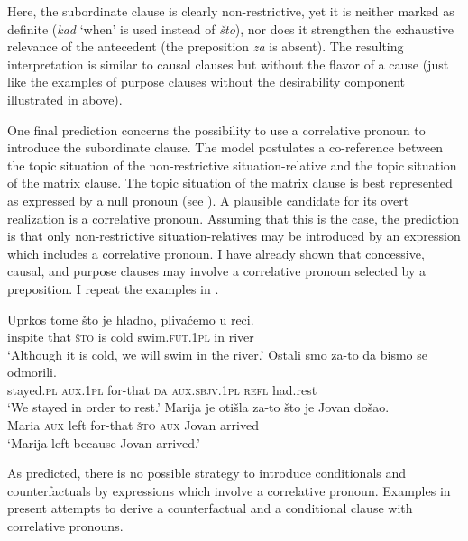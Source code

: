 \documentclass[output=paper]{langscibook}
\begin{document}
\noindent Here, the subordinate clause is clearly non-restrictive, yet it is neither marked as definite (\textit{kad} `when' is used instead of \textit{što}), nor does it strengthen the exhaustive relevance of the antecedent (the preposition \textit{za} is absent). The resulting interpretation is similar to causal clauses but without the flavor of a cause (just like the examples of purpose clauses without the desirability component illustrated in  above).

One final prediction concerns the possibility to use a correlative pronoun to introduce the subordinate clause. The model postulates a co-reference between the topic situation of the non-restrictive situation-relative and the topic situation of the matrix clause. The topic situation of the matrix clause is best represented as expressed by a null pronoun (see \citealt{Vries2002}). A plausible candidate for its overt realization is a correlative pronoun. Assuming that this is the case, the prediction is that only non-restrictive situation-relatives may be introduced by an expression which includes a correlative pronoun. I have already shown that concessive, causal, and purpose clauses may involve a correlative pronoun selected by a preposition. I repeat the examples in .

\ea\label{ex:Correl1}
	\ea \gll Uprkos tome što je hladno, plivaćemo u reci.\\
    inspite that \textsc{što} is cold swim.\textsc{fut.1pl} in river\\
    \glt `Although it is cold, we will swim in the river.'\label{ex:Correl1-a}
    \ex \gll Ostali smo za-to da bismo se odmorili.\\
    stayed.\textsc{pl} \textsc{aux.1pl} for-that \textsc{da} \textsc{aux.sbjv.1pl} \textsc{refl} had.rest\\
    \glt `We stayed in order to rest.'\label{ex:Correl1-b}
	\ex \gll Marija je otišla za-to što je Jovan došao.\\
    Maria \textsc{aux} left for-that \textsc{što} \textsc{aux} Jovan arrived\\
    \glt `Marija left because Jovan arrived.'\label{ex:Correl1-c}
\z\z

\noindent As predicted, there is no possible strategy to introduce conditionals and counterfactuals by expressions which involve a correlative pronoun. Examples in  present attempts to derive a counterfactual and a conditional clause with correlative pronouns.
\end{document}

